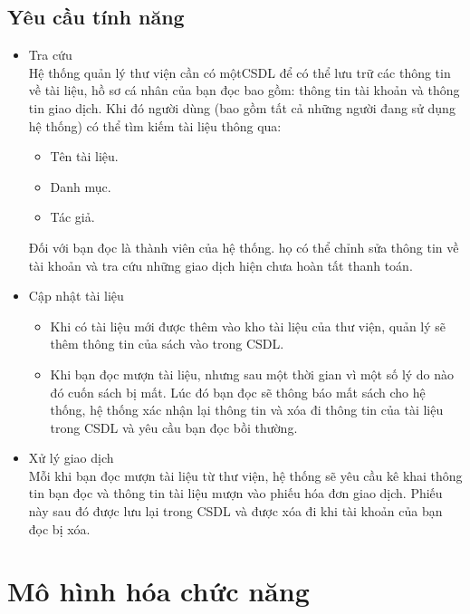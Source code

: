 \documentclass[12pt]{report}
\begin{document}
\subsection{Yêu cầu tính năng}
\begin{itemize}
    \item Tra cứu  \\
        Hệ thống quản lý thư viện cần có mộtCSDL để có thể lưu trữ các thông tin về tài liệu, 
        hồ sơ cá nhân của bạn đọc bao gồm: thông tin tài khoản và thông tin giao dịch. 
        Khi đó người dùng (bao gồm tất cả những người đang sử dụng hệ thống) có thể tìm kiếm tài liệu thông qua:
        \begin{itemize}
            \item Tên tài liệu. 
            \item Danh mục. 
            \item Tác giả. 
        \end{itemize}
        Đối với bạn đọc là thành viên của hệ thống. họ có thể chỉnh sửa thông tin 
        về tài khoản và tra cứu những giao dịch hiện chưa hoàn tất thanh toán.

    \item Cập nhật tài liệu
        \begin{itemize}
            \item Khi có tài liệu mới được thêm vào kho tài liệu của thư viện, quản lý sẽ thêm thông tin của sách vào trong CSDL.
            \item Khi bạn đọc mượn tài liệu, nhưng sau một thời gian vì một số lý do nào đó cuốn sách bị mất. 
                Lúc đó bạn đọc sẽ thông báo mất sách cho hệ thống, hệ thống xác nhận lại thông tin 
                và xóa đi thông tin của tài liệu trong CSDL và yêu cầu bạn đọc bồi thường.
        \end{itemize}

    \item Xử lý giao dịch \\
        Mỗi khi bạn đọc mượn tài liệu từ thư viện, hệ thống sẽ yêu cầu kê khai 
        thông tin bạn đọc và thông tin tài liệu mượn vào phiếu hóa đơn giao dịch. 
        Phiếu này sau đó được lưu lại trong CSDL và được xóa đi khi tài khoản của bạn đọc bị xóa.
\end{itemize}


\section{Mô hình hóa chức năng}
\end{document}
